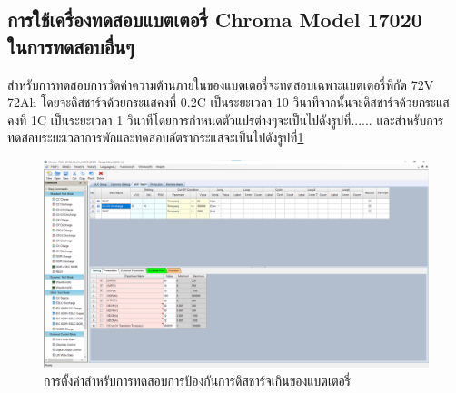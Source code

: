 \subsection{การใช้เครื่องทดสอบแบตเตอรี่ Chroma Model 17020 \\ ในการทดสอบอื่นๆ}
สำหรับการทดสอบการวัดค่าความต้านภายในของแบตเตอรี่จะทดสอบเฉพาะแบตเตอรี่พิกัด 72V 72Ah โดยจะดิสชาร์จด้วยกระแสคงที่ 0.2C เป็นระยะเวลา 10 วินาทีจากนั้นจะดิสชาร์จด้วยกระแสคงที่ 
1C เป็นระยะเวลา 1 วินาทีโดยการกำหนดตัวแปรต่างๆจะเป็นไปดังรูปที่...... และสำหรับการทดสอบระยะเวลาการพักและทดสอบอัตรากระแสจะเป็นไปดังรูปที่\ref{fig:setting_rest}
\begin{center}
	\begin{figure}[H]
		\includegraphics[width=1\linewidth]{Chapters/img/R136_DEMO/UUT_TEST_OVDCP.png}
		\centering
		\captionsetup{justification=centering,margin=2cm}
		\caption{การตั้งค่าสำหรับการทดสอบการป้องกันการดิสชาร์จเกินของแบตเตอรี่}
		\label{fig:setting_rest}
	\end{figure}
\end{center}

\begin{table}[]
\centering
\caption{การตั้งค่าสำหรับการทดสอบวัดค่าความต้านทานภายในของแบตเตอรี่ 72V72Ah}
\end{table}














